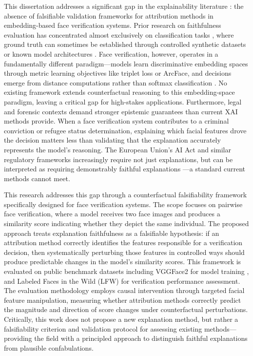 This dissertation addresses a significant gap in the explainability literature \cite{Samek2021_XAI_Review}: the absence of falsifiable validation frameworks for attribution methods in embedding-based face verification systems. Prior research on faithfulness evaluation has concentrated almost exclusively on classification tasks \cite{arrieta2020explainable}, where ground truth can sometimes be established through controlled synthetic datasets or known model architectures \cite{Zhou2022_AttributionCorrectness,Adebayo2018_SanityChecks}. Face verification, however, operates in a fundamentally different paradigm---models learn discriminative embedding spaces through metric learning objectives like triplet loss or ArcFace, and decisions emerge from distance computations rather than softmax classification \cite{schroff2015facenet,deng2019arcface,kaya2019metric}. No existing framework extends counterfactual reasoning \cite{wachter2017counterfactual,Kenny2021_PlausibleCounterfactuals,mothilal2020diverse} to this embedding-space paradigm, leaving a critical gap for high-stakes applications. Furthermore, legal and forensic contexts demand stronger epistemic guarantees than current XAI methods provide. When a face verification system contributes to a criminal conviction or refugee status determination, explaining which facial features drove the decision matters less than validating that the explanation accurately represents the model's reasoning. The European Union's AI Act and similar regulatory frameworks increasingly require not just explanations, but can be interpreted as requiring demonstrably faithful explanations \cite{euaiact2024}---a standard current methods cannot meet.

This research addresses this gap through a counterfactual falsifiability framework specifically designed for face verification systems. The scope focuses on pairwise face verification, where a model receives two face images and produces a similarity score indicating whether they depict the same individual. The proposed approach treats explanation faithfulness as a falsifiable hypothesis: if an attribution method correctly identifies the features responsible for a verification decision, then systematically perturbing those features in controlled ways should produce predictable changes in the model's similarity scores. This framework is evaluated on public benchmark datasets including VGGFace2 for model training \cite{cao2018vggface2}, and Labeled Faces in the Wild (LFW) \cite{huang2007lfw} for verification performance assessment. The evaluation methodology employs causal intervention through targeted facial feature manipulation, measuring whether attribution methods correctly predict the magnitude and direction of score changes under counterfactual perturbations. Critically, this work does not propose a new explanation method, but rather a falsifiability criterion and validation protocol for assessing existing methods---providing the field with a principled approach to distinguish faithful explanations from plausible confabulations.

